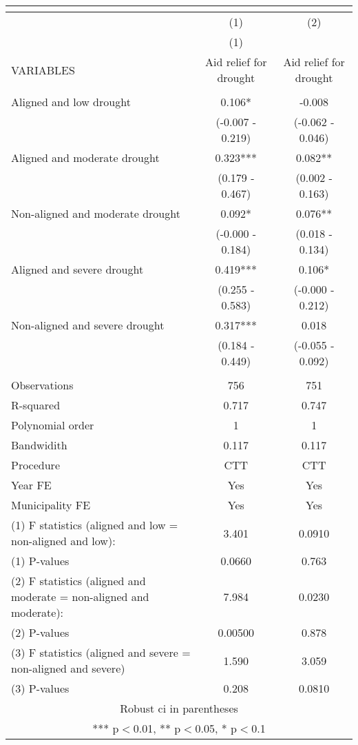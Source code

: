 \begin{tabular}{lcc}
\multicolumn{3}{c}{} \\ \hline
 & (1) & (2) \\
 & (1) &  \\
VARIABLES & Aid relief for drought & Aid relief for drought \\ \hline
 &  &  \\
Aligned and low drought & 0.106* & -0.008 \\
 & (-0.007 - 0.219) & (-0.062 - 0.046) \\
Aligned and moderate drought & 0.323*** & 0.082** \\
 & (0.179 - 0.467) & (0.002 - 0.163) \\
Non-aligned and moderate drought & 0.092* & 0.076** \\
 & (-0.000 - 0.184) & (0.018 - 0.134) \\
Aligned and severe drought & 0.419*** & 0.106* \\
 & (0.255 - 0.583) & (-0.000 - 0.212) \\
Non-aligned and severe drought & 0.317*** & 0.018 \\
 & (0.184 - 0.449) & (-0.055 - 0.092) \\
 &  &  \\
Observations & 756 & 751 \\
R-squared & 0.717 & 0.747 \\
Polynomial order & 1 & 1 \\
Bandwidith & 0.117 & 0.117 \\
Procedure & CTT & CTT \\
Year FE & Yes & Yes \\
Municipality FE & Yes & Yes \\
(1) F statistics (aligned and low = non-aligned and low): & 3.401 & 0.0910 \\
(1) \hspace{1mm} P-values & 0.0660 & 0.763 \\
(2) F statistics (aligned and moderate = non-aligned and moderate): & 7.984 & 0.0230 \\
(2) \hspace{1mm} P-values & 0.00500 & 0.878 \\
(3) F statistics (aligned and severe = non-aligned and severe) & 1.590 & 3.059 \\
 (3) \hspace{1mm} P-values & 0.208 & 0.0810 \\ \hline
\multicolumn{3}{c}{ Robust ci in parentheses} \\
\multicolumn{3}{c}{ *** p$<$0.01, ** p$<$0.05, * p$<$0.1} \\
\end{tabular}
